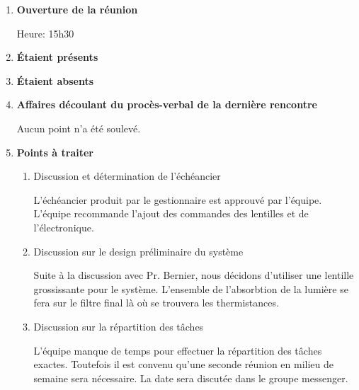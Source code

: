 \documentclass[12pt]{ULojpv}
\begin{document}
\entete
\begin{enumerate}

\item \textbf{Ouverture de la réunion}

Heure: 15h30

\item \textbf{Étaient présents}


\item \textbf{Étaient absents}

\item \textbf{Affaires découlant du procès-verbal de la dernière rencontre}

Aucun point n'a été soulevé.


\item \textbf{Points à traiter}
   \begin{enumerate}
      \item Discussion et détermination de l'échéancier
      
      L'échéancier produit par le gestionnaire est approuvé par l'équipe.
      L'équipe recommande l'ajout des commandes des lentilles et de l'électronique. 
      
      
      \item Discussion sur le design préliminaire du système
      
      Suite à la discussion avec Pr. Bernier, nous décidons d'utiliser une lentille grossissante pour le système.
      L'ensemble de l'absorbtion de la lumière se fera sur le filtre final là où se trouvera les thermistances.
      
      \item Discussion sur la répartition des tâches
      
      L'équipe manque de temps pour effectuer la répartition des tâches exactes. Toutefois il est convenu qu'une
      seconde réunion en milieu de semaine sera nécessaire. La date sera discutée dans le groupe messenger.
      

\end{enumerate}
\end{enumerate}
\end{document}
